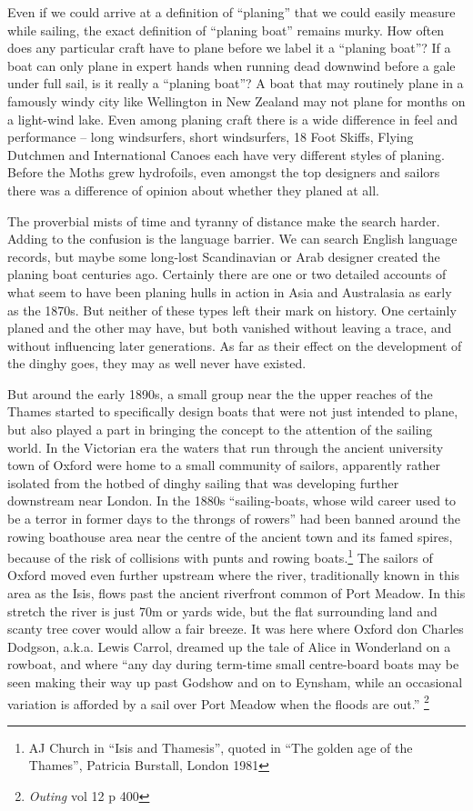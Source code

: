 \documentclass[
  letterpaper,
]{scrbook}
\begin{document}
Even if we could arrive at a definition of ``planing'' that we could
easily measure while sailing, the exact definition of ``planing boat''
remains murky. How often does any particular craft have to plane before
we label it a ``planing boat''? If a boat can only plane in expert hands
when running dead downwind before a gale under full sail, is it really a
``planing boat''? A boat that may routinely plane in a famously windy
city like Wellington in New Zealand may not plane for months on a
light-wind lake. Even among planing craft there is a wide difference in
feel and performance -- long windsurfers, short windsurfers, 18 Foot
Skiffs, Flying Dutchmen and International Canoes each have very
different styles of planing. Before the Moths grew hydrofoils, even
amongst the top designers and sailors there was a difference of opinion
about whether they planed at all.

The proverbial mists of time and tyranny of distance make the search
harder. Adding to the confusion is the language barrier. We can search
English language records, but maybe some long-lost Scandinavian or Arab
designer created the planing boat centuries ago. Certainly there are one
or two detailed accounts of what seem to have been planing hulls in
action in Asia and Australasia as early as the 1870s. But neither of
these types left their mark on history. One certainly planed and the
other may have, but both vanished without leaving a trace, and without
influencing later generations. As far as their effect on the development
of the dinghy goes, they may as well never have existed.

But around the early 1890s, a small group near the the upper reaches of
the Thames started to specifically design boats that were not just
intended to plane, but also played a part in bringing the concept to the
attention of the sailing world. In the Victorian era the waters that run
through the ancient university town of Oxford were home to a small
community of sailors, apparently rather isolated from the hotbed of
dinghy sailing that was developing further downstream near London. In
the 1880s ``sailing-boats, whose wild career used to be a terror in
former days to the throngs of rowers'' had been banned around the rowing
boathouse area near the centre of the ancient town and its famed spires,
because of the risk of collisions with punts and rowing
boats.\footnote{AJ Church in ``Isis and Thamesis'', quoted in ``The
  golden age of the Thames'', Patricia Burstall, London 1981} The
sailors of Oxford moved even further upstream where the river,
traditionally known in this area as the Isis, flows past the ancient
riverfront common of Port Meadow. In this stretch the river is just 70m
or yards wide, but the flat surrounding land and scanty tree cover would
allow a fair breeze. It was here where Oxford don Charles Dodgson,
a.k.a. Lewis Carrol, dreamed up the tale of Alice in Wonderland on a
rowboat, and where ``any day during term-time small centre-board boats
may be seen making their way up past Godshow and on to Eynsham, while an
occasional variation is afforded by a sail over Port Meadow when the
floods are out.'' \footnote{\emph{Outing} vol 12 p 400}
\end{document}
